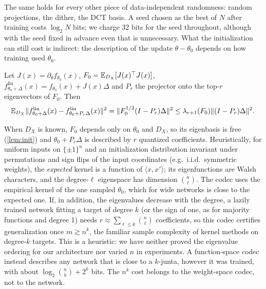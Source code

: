 The same holds for every other piece of data-independent randomness: random projections, the dither, the DCT basis. A seed chosen as the best of $N$ after training costs $\log_2N$ bits; we charge 32 bits for the seed throughout, although with the seed fixed in advance even that is unnecessary. What the initialization can still cost is indirect: the description of the update $\theta-\theta_0$ depends on how training used $\theta_0$.

\begin{proposition}\label{prop:kernel}
Let $J(x)=\partial_\theta f_{\theta_0}(x)$, $F_0=\mathbb{E}_{D_X}[J(x)^\top J(x)]$, $f^{\mathrm{lin}}_{\theta_0+\Delta}(x)=f_{\theta_0}(x)+J(x)\Delta$ and $P_r$ the projector onto the top-$r$ eigenvectors of $F_0$. Then
\[
\mathbb{E}_{D_X}\|f^{\mathrm{lin}}_{\theta_0+\Delta}(x)-f^{\mathrm{lin}}_{\theta_0+P_r\Delta}(x)\|^2=\|F_0^{1/2}(I-P_r)\Delta\|^2\le\lambda_{r+1}(F_0)\|(I-P_r)\Delta\|^2.
\]
\end{proposition}

When $D_X$ is known, $F_0$ depends only on $\theta_0$ and $D_X$, so its eigenbasis is free (\cref{lem:init}) and $\theta_0+P_r\Delta$ is described by $r$ quantized coefficients. Heuristically, for uniform inputs on $\{\pm1\}^n$ and an initialization distribution invariant under permutations and sign flips of the input coordinates (e.g.\ i.i.d.\ symmetric weights), the \emph{expected} kernel is a function of $\langle x,x'\rangle$; its eigenfunctions are Walsh characters, and the degree-$\ell$ eigenspace has dimension $\binom n\ell$. The codec uses the empirical kernel of the one sampled $\theta_0$, which for wide networks is close to the expected one. If, in addition, the eigenvalues decrease with the degree, a lazily trained network fitting a target of degree $k$ (or the sign of one, as for majority functions and degree 1) needs $r\approx\sum_{\ell\le k}\binom n\ell$ coefficients, so this codec certifies generalization once $m\gtrsim n^k$, the familiar sample complexity of kernel methods on degree-$k$ targets. This is a heuristic: we have neither proved the eigenvalue ordering for our architecture nor varied $n$ in experiments. A function-space codec instead describes any network that is close to a $k$-junta, however it was trained, with about $\log_2\binom nk+2^k$ bits. The $n^k$ cost belongs to the weight-space codec, not to the network.
